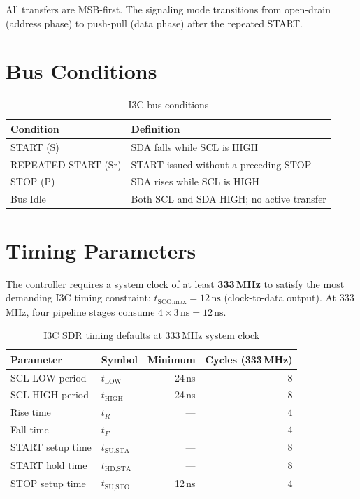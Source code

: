 \documentclass[12pt, a4paper, oneside]{report}
\begin{document}
All transfers are MSB-first. The signaling mode transitions from open-drain (address
phase) to push-pull (data phase) after the repeated START.

\section{Bus Conditions}

\begin{table}[H]
\centering
\caption{I3C bus conditions}
\label{tab:bus_conditions}
\begin{tabular}{L{4cm} L{9cm}}
\toprule
\textbf{Condition} & \textbf{Definition} \\
\midrule
START (S)           & SDA falls while SCL is HIGH \\
REPEATED START (Sr) & START issued without a preceding STOP \\
STOP (P)            & SDA rises while SCL is HIGH \\
Bus Idle            & Both SCL and SDA HIGH; no active transfer \\
\bottomrule
\end{tabular}
\end{table}

\section{Timing Parameters}

The controller requires a system clock of at least \textbf{333\,MHz} to satisfy the
most demanding I3C timing constraint: $t_{\text{SCO,max}} = 12\,\text{ns}$ (clock-to-data
output). At 333\,MHz, four pipeline stages consume $4 \times 3\,\text{ns} = 12\,\text{ns}$.

\begin{table}[H]
\centering
\caption{I3C SDR timing defaults at 333\,MHz system clock}
\label{tab:timing}
\begin{tabular}{llrr}
\toprule
\textbf{Parameter} & \textbf{Symbol} & \textbf{Minimum} & \textbf{Cycles (333\,MHz)} \\
\midrule
SCL LOW period      & $t_{\text{LOW}}$    & 24\,ns & 8 \\
SCL HIGH period     & $t_{\text{HIGH}}$   & 24\,ns & 8 \\
Rise time           & $t_R$               & ---    & 4 \\
Fall time           & $t_F$               & ---    & 4 \\
START setup time    & $t_{\text{SU,STA}}$ & ---    & 8 \\
START hold time     & $t_{\text{HD,STA}}$ & ---    & 8 \\
STOP setup time     & $t_{\text{SU,STO}}$ & 12\,ns & 4 \\
\bottomrule
\end{tabular}
\end{table}
\end{document}
